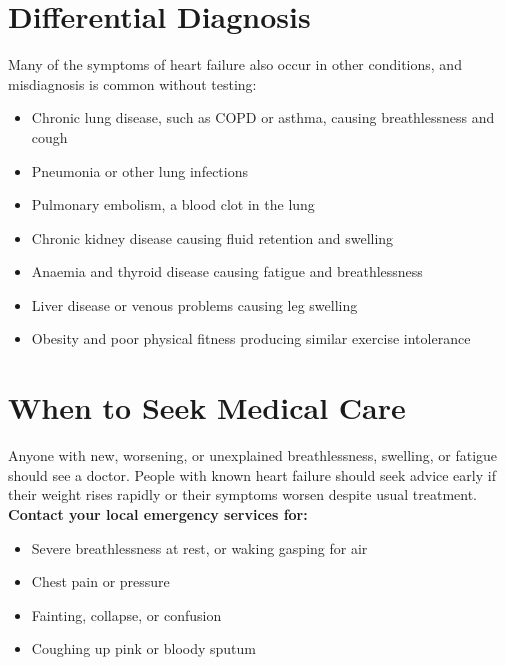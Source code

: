\section*{Differential Diagnosis}
Many of the symptoms of heart failure also occur in other conditions, and misdiagnosis is common without testing:
\begin{itemize}
    \item Chronic lung disease, such as COPD or asthma, causing breathlessness and cough
    \item Pneumonia or other lung infections
    \item Pulmonary embolism, a blood clot in the lung
    \item Chronic kidney disease causing fluid retention and swelling
    \item Anaemia and thyroid disease causing fatigue and breathlessness
    \item Liver disease or venous problems causing leg swelling
    \item Obesity and poor physical fitness producing similar exercise intolerance
\end{itemize}

\section*{When to Seek Medical Care}
Anyone with new, worsening, or unexplained breathlessness, swelling, or fatigue should see a doctor. People with known heart failure should seek advice early if their weight rises rapidly or their symptoms worsen despite usual treatment.
\textbf{Contact your local emergency services for:}
\begin{itemize}
    \item Severe breathlessness at rest, or waking gasping for air
    \item Chest pain or pressure
    \item Fainting, collapse, or confusion
    \item Coughing up pink or bloody sputum
\end{itemize}

